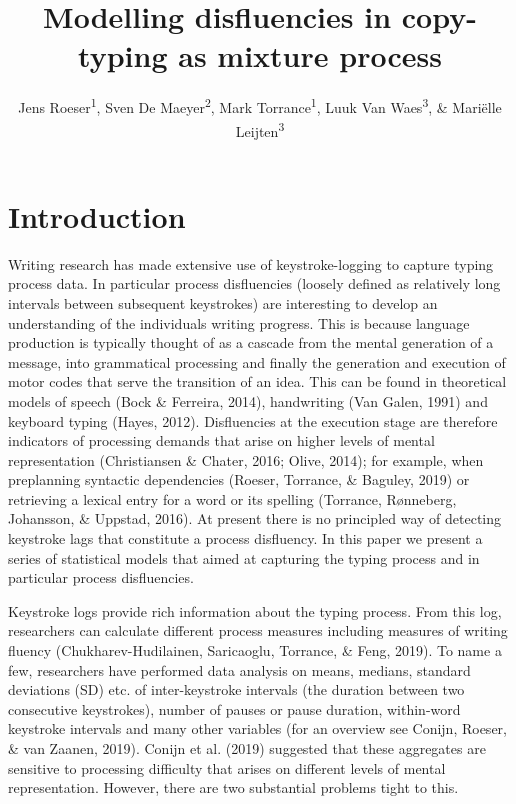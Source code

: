 \documentclass[english,man,floatsintext]{apa7}
\author{Jens Roeser\textsuperscript{1}, Sven De Maeyer\textsuperscript{2}, Mark Torrance\textsuperscript{1}, Luuk Van Waes\textsuperscript{3}, \& Mariëlle Leijten\textsuperscript{3}}
\affiliation{
\vspace{0.5cm}
\textsuperscript{1} Department of Psychology, Nottingham Trent University, United Kingdom\\\textsuperscript{2} Faculty of Social Sciences, University of Antwerp, Belgium\\\textsuperscript{3} Department of Management, University of Antwerp, Belgium}
\title{Modelling disfluencies in copy-typing as mixture process}
\date{}
\begin{document}
\maketitle

\hypertarget{introduction}{%
\section{Introduction}\label{introduction}}

Writing research has made extensive use of keystroke-logging to capture typing process data. In particular process disfluencies (loosely defined as relatively long intervals between subsequent keystrokes) are interesting to develop an understanding of the individuals writing progress. This is because language production is typically thought of as a cascade from the mental generation of a message, into grammatical processing and finally the generation and execution of motor codes that serve the transition of an idea. This can be found in theoretical models of speech (Bock \& Ferreira, 2014), handwriting (Van Galen, 1991) and keyboard typing (Hayes, 2012). Disfluencies at the execution stage are therefore indicators of processing demands that arise on higher levels of mental representation (Christiansen \& Chater, 2016; Olive, 2014); for example, when preplanning syntactic dependencies (Roeser, Torrance, \& Baguley, 2019) or retrieving a lexical entry for a word or its spelling (Torrance, Rønneberg, Johansson, \& Uppstad, 2016). At present there is no principled way of detecting keystroke lags that constitute a process disfluency. In this paper we present a series of statistical models that aimed at capturing the typing process and in particular process disfluencies.

Keystroke logs provide rich information about the typing process. From this log, researchers can calculate different process measures including measures of writing fluency (Chukharev-Hudilainen, Saricaoglu, Torrance, \& Feng, 2019). To name a few, researchers have performed data analysis on means, medians, standard deviations (SD) etc. of inter-keystroke intervals (the duration between two consecutive keystrokes), number of pauses or pause duration, within-word keystroke intervals and many other variables (for an overview see Conijn, Roeser, \& van Zaanen, 2019). Conijn et al. (2019) suggested that these aggregates are sensitive to processing difficulty that arises on different levels of mental representation. However, there are two substantial problems tight to this.
\end{document}
